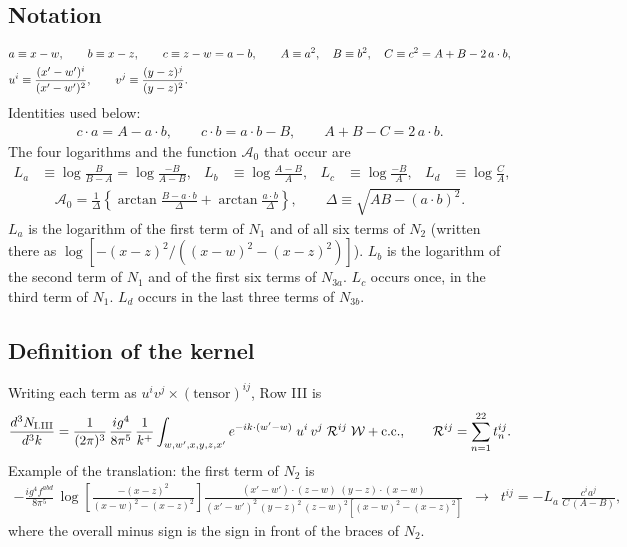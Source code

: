 \documentclass[10pt]{article}
\numberwithin{equation}{section}
\begin{document}
\subsection{Notation}
\begin{align}
&a\equiv x-w,\qquad b\equiv x-z,\qquad c\equiv z-w=a-b,\qquad A\equiv a^{2},\quad B\equiv b^{2},\quad C\equiv c^{2}=A+B-2\,a\cdot b,\notag\\
&u^{i}\equiv\frac{(x'-w')^{i}}{(x'-w')^{2}},\qquad v^{j}\equiv\frac{(y-z)^{j}}{(y-z)^{2}} .
\end{align}
Identities used below:
\begin{align}
c\cdot a=A-a\cdot b,\qquad c\cdot b=a\cdot b-B,\qquad A+B-C=2\,a\cdot b. \label{eq:ids}
\end{align}
The four logarithms and the function $\mathcal{A}_{0}$ that occur are
\begin{align}
L_{a}&\equiv\log\frac{B}{B-A}=\log\frac{-B}{A-B}, & L_{b}&\equiv\log\frac{A-B}{A}, & L_{c}&\equiv\log\frac{-B}{A}, & L_{d}&\equiv\log\frac{C}{A},
\end{align}
\begin{align}
\mathcal{A}_{0}=\frac{1}{\Delta}\left\{\arctan\frac{B-a\cdot b}{\Delta}+\arctan\frac{a\cdot b}{\Delta}\right\},\qquad\Delta\equiv\sqrt{AB-(a\cdot b)^{2}} .
\end{align}
$L_{a}$ is the logarithm of the first term of $N_{1}$ and of all six terms of $N_{2}$ (written there as $\log[-(x-z)^{2}/((x-w)^{2}-(x-z)^{2})]$). $L_{b}$ is the logarithm of the second term of $N_{1}$ and of the first six terms of $N_{3a}$. $L_{c}$ occurs once, in the third term of $N_{1}$. $L_{d}$ occurs in the last three terms of $N_{3b}$.

\subsection{Definition of the kernel}
Writing each term as $u^{i}v^{j}\times(\text{tensor})^{ij}$, Row III is
\begin{align}
\frac{d^{3}N_{\rm I.III}}{d^{3}k}=\frac{1}{(2\pi)^{3}}\,\frac{i g^{4}}{8\pi^{5}}\,\frac{1}{k^{+}}\int_{w,w',x,y,z,x'}e^{-ik\cdot(w'-w)}\;u^{i}\,v^{j}\;\mathcal{R}^{ij}\;\mathcal{W}+{\rm c.c.},\qquad
\mathcal{R}^{ij}=\sum_{n=1}^{22}t_{n}^{ij}. \label{eq:def}
\end{align}
Example of the translation: the first term of $N_{2}$ is
\begin{align}
-\frac{ig^{4}f^{abd}}{8\pi^{5}}\,\log\!\left[\frac{-(x-z)^{2}}{(x-w)^{2}-(x-z)^{2}}\right]\frac{(x'-w')\cdot(z-w)\;(y-z)\cdot(x-w)}{(x'-w')^{2}\,(y-z)^{2}\,(z-w)^{2}\left[(x-w)^{2}-(x-z)^{2}\right]}
\;\;\longrightarrow\;\;t^{ij}=-L_{a}\,\frac{c^{i}a^{j}}{C\,(A-B)},
\end{align}
where the overall minus sign is the sign in front of the braces of $N_{2}$.
\end{document}
